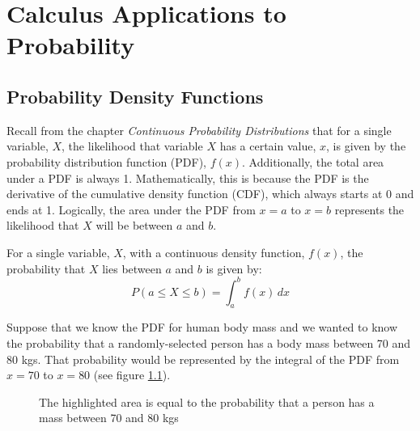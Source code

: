 \chapter{Calculus Applications to Probability}

\section{Probability Density Functions}
Recall from the chapter \textit{Continuous Probability Distributions} that for 
a single variable, $X$, the likelihood that variable $X$ has a certain value, 
$x$, is given by the probability distribution function (PDF), $f(x)$. 
Additionally, the total area under a PDF is always 1. Mathematically, this is 
because the PDF is the derivative of the cumulative density function (CDF), 
which always starts at 0 and ends at 1. Logically, the area under the PDF from 
$x = a$ to $x = b$ represents the likelihood that $X$ will be between $a$ and 
$b$. 

\begin{mdframed}[style = important, frametitle = {Probability that $X$ lies 
between $a$ and $b$}]
For a single variable, $X$, with a continuous density function, $f(x)$, the 
probability that $X$ lies between $a$ and $b$ is given by:
$$P( a \leq X \leq b) = \int_a^b f(x)\,dx$$
\end{mdframed}

Suppose that we know the PDF for human body mass and we wanted to know the 
probability that a randomly-selected person has a body mass between 70 and 80 
kgs. That probability would be represented by the integral of the PDF from $x 
= 70$ to $x = 80$ (see figure \ref{fig:mass_PDF}). 

\begin{figure}[H]
    \centering
    \caption{The highlighted area is equal to the probability that a person 
    has a mass between 70 and 80 kgs}
    \label{fig:mass_PDF}
\end{figure}

